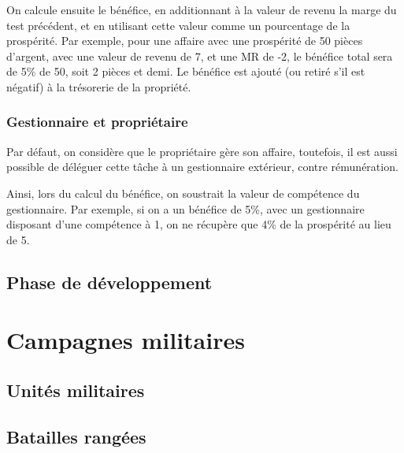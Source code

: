 \documentclass[10pt,a4paper]{book}
\begin{document}
\begin{multicols}{2}
On calcule ensuite le bénéfice, en additionnant à la valeur de revenu la marge du test précédent, et en utilisant cette valeur comme un pourcentage de la prospérité. Par exemple, pour une affaire avec une prospérité de 50 pièces d'argent, avec une valeur de revenu de 7, et une MR de -2, le bénéfice total sera de 5\% de 50, soit 2 pièces et demi. Le bénéfice est ajouté (ou retiré s'il est négatif) à la trésorerie de la propriété.
\subsubsection{Gestionnaire et propriétaire}
Par défaut, on considère que le propriétaire gère son affaire, toutefois, il est aussi possible de déléguer cette tâche à un gestionnaire extérieur, contre rémunération. 

Ainsi, lors du calcul du bénéfice, on soustrait la valeur de compétence du gestionnaire. Par exemple, si on a un bénéfice de 5\%, avec un gestionnaire disposant d'une compétence à 1, on ne récupère que 4\% de la prospérité au lieu de 5.

\subsection{Phase de développement}
\section{Campagnes militaires}
\subsection{Unités militaires}
\subsection{Batailles rangées}
\end{multicols}
\end{document}
